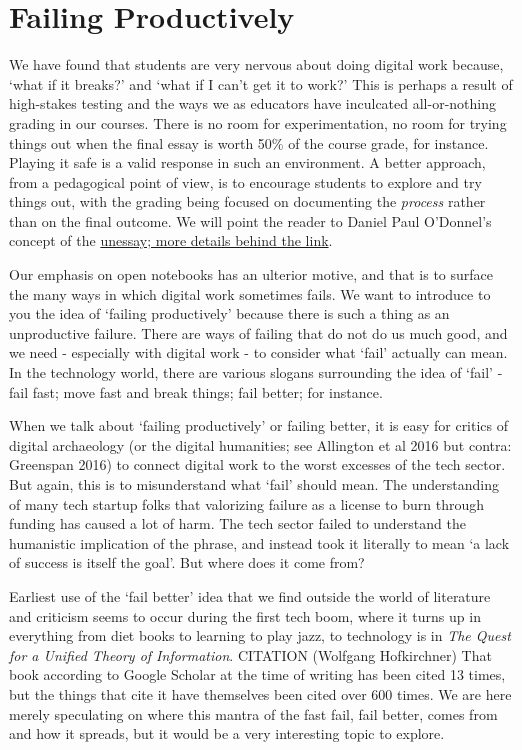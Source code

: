 \documentclass[english,]{book}
\begin{document}
\hypertarget{failing-productively}{\section{Failing
Productively}\label{failing-productively}}

We have found that students are very nervous about doing digital work
because, `what if it breaks?' and `what if I can't get it to work?' This
is perhaps a result of high-stakes testing and the ways we as educators
have inculcated all-or-nothing grading in our courses. There is no room
for experimentation, no room for trying things out when the final essay
is worth 50\% of the course grade, for instance. Playing it safe is a
valid response in such an environment. A better approach, from a
pedagogical point of view, is to encourage students to explore and try
things out, with the grading being focused on documenting the
\emph{process} rather than on the final outcome. We will point the
reader to Daniel Paul O'Donnel's concept of the
\href{http://people.uleth.ca/~daniel.odonnell/Teaching/the-unessay}{unessay;
more details behind the link}.

Our emphasis on open notebooks has an ulterior motive, and that is to
surface the many ways in which digital work sometimes fails. We want to
introduce to you the idea of `failing productively' because there is
such a thing as an unproductive failure. There are ways of failing that
do not do us much good, and we need - especially with digital work - to
consider what `fail' actually can mean. In the technology world, there
are various slogans surrounding the idea of `fail' - fail fast; move
fast and break things; fail better; for instance.

When we talk about `failing productively' or failing better, it is easy
for critics of digital archaeology (or the digital humanities; see
Allington et al 2016 but contra: Greenspan 2016) to connect digital work
to the worst excesses of the tech sector. But again, this is to
misunderstand what `fail' should mean. The understanding of many tech
startup folks that valorizing failure as a license to burn through
funding has caused a lot of harm. The tech sector failed to understand
the humanistic implication of the phrase, and instead took it literally
to mean `a lack of success is itself the goal'. But where does it come
from?

Earliest use of the `fail better' idea that we find outside the world of
literature and criticism seems to occur during the first tech boom,
where it turns up in everything from diet books to learning to play
jazz, to technology is in \emph{The Quest for a Unified Theory of
Information}. CITATION (Wolfgang Hofkirchner) That book according to
Google Scholar at the time of writing has been cited 13 times, but the
things that cite it have themselves been cited over 600 times. We are
here merely speculating on where this mantra of the fast fail, fail
better, comes from and how it spreads, but it would be a very
interesting topic to explore.
\end{document}
